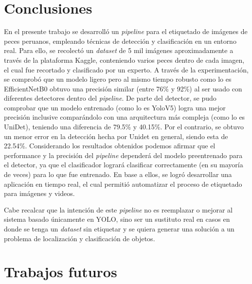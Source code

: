 \section{Conclusiones}
En el presente trabajo se desarrolló un \textit{pipeline} para el
etiquetado de imágenes de peces peruanos, empleando técnicas de detección y 
clasificación en un entorno real. Para ello, se recolectó un 
\textit{dataset} de 5 mil imágenes aproximadamente a través de la plataforma 
Kaggle, conteniendo varios peces dentro de cada imagen, el cual fue 
recortado y clasificado por un experto. 
A través de la experimentación, se comprobó que un modelo 
ligero pero al mismo tiempo robusto como lo es EfficientNetB0 obtuvo una 
precisión similar (entre 76\% y 92\%) al ser usado con diferentes detectores 
dentro del \textit{pipeline}. 
De parte del detector, se pudo comprobar que un modelo entrenado (como lo es YoloV5) 
logra una mejor precisión inclusive comparándolo con una arquitectura más compleja 
(como lo es UniDet), teniendo una diferencia de 79.5\% y 40.15\%. Por el contrario, 
se obtuvo un menor error en la detección hecha por Unidet en general, siendo esta de 
22.54\%. 
\newline
\newline
Considerando los resultados obtenidos podemos afirmar que el performance y 
la precisión del \textit{pipeline} dependerá del modelo preentrenado para el detector, 
ya que el clasificador logrará clasificar correctamente (en su mayoría de veces) para lo 
que fue entrenado. En base a ellos, se logró desarrollar una aplicación en tiempo real, 
el cual permitió automatizar el proceso de etiquetado para imágenes y videos.

Cabe recalcar que la intención de este \textit{pipeline} no es reemplazar o mejorar al 
sistema basado únicamente en YOLO, sino ser un sustituto real en casos en donde 
se tenga un \textit{dataset} sin etiquetar y se quiera generar una solución a un 
problema de localización y clasificación de objetos. 

\section{Trabajos futuros}

